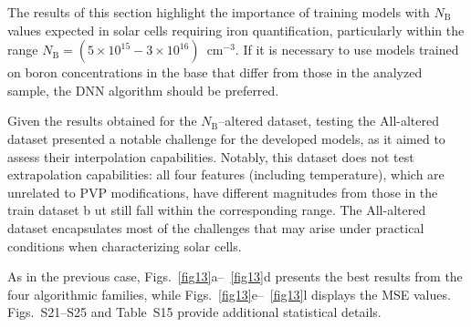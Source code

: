 \documentclass[a4paper,fleqn,draft]{cas-sc}
\begin{document}
The results of this section highlight the importance of training models with $N_\mathrm{B}$ values expected
in solar cells requiring iron quantification, particularly within the range $N_\mathrm{B}=(5\times10^{15}-3\times10^{16})$~cm$^{-3}$.
If it is necessary to use models trained on boron concentrations in the base that differ from those in the analyzed sample,
the DNN algorithm should be preferred.


Given the results obtained for the $N_\mathrm{B}$--altered dataset,
testing the All-altered dataset presented a notable challenge for the developed models,
as it aimed to assess their interpolation capabilities.
Notably, this dataset does not test extrapolation capabilities: all four features (including temperature),
which are unrelated to PVP modifications, have different magnitudes from those in the train dataset b
ut still fall within the corresponding range.
The All-altered dataset encapsulates most of the challenges that may arise under practical conditions when characterizing solar cells.

As in the previous case, Figs.~\ref{fig13}a--~\ref{fig13}d presents the best results from the four algorithmic families,
while Figs.~\ref{fig13}e--~\ref{fig13}l displays the MSE values.
Figs.~S21--S25 and Table~S15 provide additional statistical details.
\end{document}
